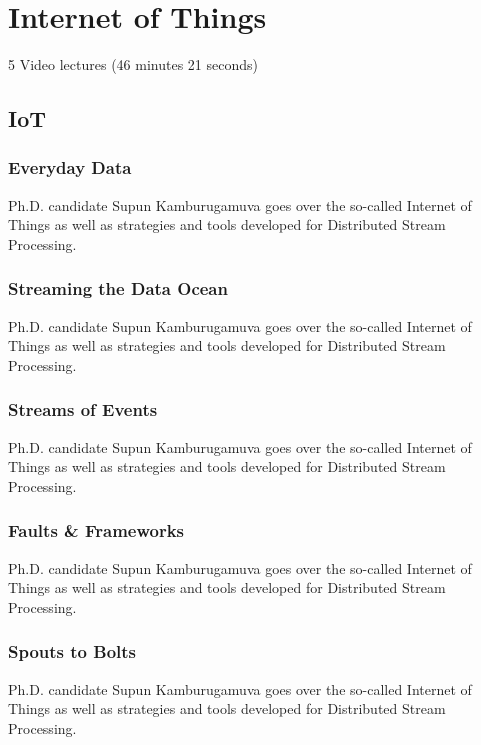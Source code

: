 \part{Internet of Things}
\label{sec:icloud-iot}

  5 Video lectures (46 minutes 21 seconds)

\chapter{IoT}

\section{Everyday Data}

Ph.D. candidate Supun Kamburugamuva goes over the so-called Internet of
Things as well as strategies and tools developed for Distributed Stream
Processing.


\section{Streaming the Data Ocean}

Ph.D. candidate Supun Kamburugamuva goes over the so-called Internet of
Things as well as strategies and tools developed for Distributed Stream
Processing.


\section{Streams of Events}

Ph.D. candidate Supun Kamburugamuva goes over the so-called Internet of
Things as well as strategies and tools developed for Distributed Stream
Processing.


\section{Faults \& Frameworks}

Ph.D. candidate Supun Kamburugamuva goes over the so-called Internet of
Things as well as strategies and tools developed for Distributed Stream
Processing.


\section{Spouts to Bolts}

Ph.D. candidate Supun Kamburugamuva goes over the so-called Internet of
Things as well as strategies and tools developed for Distributed Stream
Processing.


